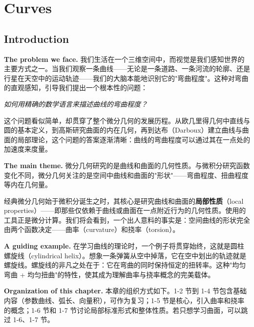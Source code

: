 \chapter{Curves}\label{chap:curves}

\section{Introduction}\label{sec:intro}

\textbf{The problem we face.} 我们生活在一个三维空间中，而视觉是我们感知世界的主要方式之一。当我们观察一条曲线——无论是一条道路、一条河流的轮廓、还是行星在天空中的运动轨迹——我们的大脑本能地识别它的"弯曲程度"。这种对弯曲的直观感知，引导我们提出一个根本性的问题：

\textit{如何用精确的数学语言来描述曲线的弯曲程度？}

这个问题看似简单，却贯穿了整个微分几何的发展历程。从欧几里得几何中直线与圆的基本定义，到高斯研究曲面的内在几何，再到达布（Darboux）建立曲线与曲面的局部理论，这个问题的答案逐渐清晰：曲线的弯曲程度可以通过其在一点处的加速度来度量。

\textbf{The main theme.} 微分几何研究的是曲线和曲面的几何性质。与微积分研究函数变化不同，微分几何关注的是空间中曲线和曲面的"形状"——弯曲程度、扭曲程度等内在几何量。

经典微分几何始于微积分诞生之时，其核心是研究曲线和曲面的\textbf{局部性质}（local properties）——即那些仅依赖于曲线或曲面在一点附近行为的几何性质。使用的工具正是微分计算。我们将会看到，一个出人意料的事实是：空间曲线的形状完全由两个函数决定——曲率（curvature）和挠率（torsion）。

\textbf{A guiding example.} 在学习曲线的理论时，一个例子将贯穿始终，这就是圆柱螺旋线（cylindrical helix）。想象一条弹簧从空中掉落，它在空中划出的轨迹就是螺旋线。螺旋线的非凡之处在于：它在弯曲的同时保持恒定的扭转率。这种"均匀弯曲 + 均匀扭曲"的特性，使其成为理解曲率与挠率概念的完美载体。

\textbf{Organization of this chapter.} 本章的组织方式如下。1-2 节到 1-4 节包含基础内容（参数曲线、弧长、向量积），可作为复习；1-5 节是核心，引入曲率和挠率的概念；1-6 节和 1-7 节讨论局部标准形式和整体性质。若只想学习曲面，可以跳过 1-6、1-7 节。

